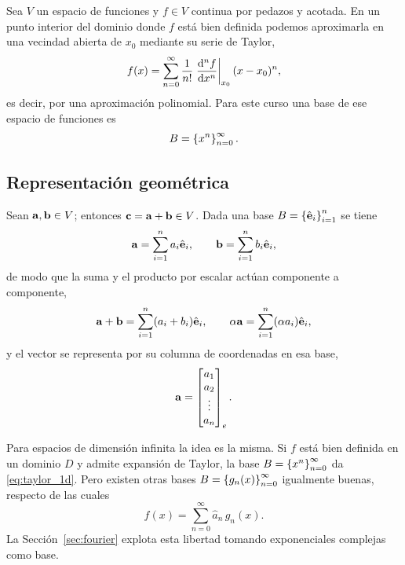 \begin{ejemplo}
  \label{ej:base_infinita}
  Sea $V$ un espacio de funciones y $f\in V$ continua por pedazos y acotada. En
  un punto interior del dominio donde $f$ est\'a bien definida podemos
  aproximarla en una vecindad abierta de $x_0$ mediante su serie de Taylor,
  \begin{equation}
    \label{eq:taylor_1d}
    f(x)=\sum_{n=0}^{\infty}\frac{1}{n!}
      \left. \frac{\mathrm{d}^{n}f}{\mathrm{d}x^{n}} \right|_{x_0}(x-x_0)^n ,
  \end{equation}
  es decir, por una aproximaci\'on polinomial. Para este curso una base de ese
  espacio de funciones es
  \begin{equation}
    \label{eq:base_polinomial}
    B=\left\{ x^n \right\}_{n=0}^{\infty}.
  \end{equation}
\end{ejemplo}

\subsection{Representaci\'on geom\'etrica}
\label{subsec:representacion_geometrica}

Sean $\mathbf{a},\mathbf{b}\in V$; entonces $\mathbf{c}=\mathbf{a}+\mathbf{b}\in V$. Dada una base
$B=\left\{ \hat{\mathbf{e}}_i \right\}_{i=1}^{n}$ se tiene
\begin{equation}
  \label{eq:expansion_base}
  \mathbf{a}=\sum_{i=1}^{n}a_i\hat{\mathbf{e}}_i,
  \qquad
  \mathbf{b}=\sum_{i=1}^{n}b_i\hat{\mathbf{e}}_i,
\end{equation}
de modo que la suma y el producto por escalar act\'uan componente a componente,
\begin{equation}
  \label{eq:suma_componentes}
  \mathbf{a}+\mathbf{b}=\sum_{i=1}^{n}(a_i+b_i)\hat{\mathbf{e}}_i,
  \qquad
  \alpha\mathbf{a}=\sum_{i=1}^{n}(\alpha a_i)\hat{\mathbf{e}}_i ,
\end{equation}
y el vector se representa por su columna de coordenadas en esa base,
\begin{equation}
  \label{eq:columna_coordenadas}
  \mathbf{a}=
  \begin{bmatrix}
    a_1\\a_2\\\vdots\\a_n
  \end{bmatrix}_{e}.
\end{equation}

Para espacios de dimensi\'on infinita la idea es la misma. Si $f$ est\'a bien
definida en un dominio $D$ y admite expansi\'on de Taylor, la base
$B=\left\{ x^n \right\}_{n=0}^{\infty}$ da \eqref{eq:taylor_1d}. Pero existen otras bases
$B=\left\{ g_n(x) \right\}_{n=0}^{\infty}$ igualmente buenas, respecto de las cuales
\begin{equation}
  \label{eq:expansion_general}
  f(x)=\sum_{n=0}^{\infty}\hat{a}_n\,g_n(x).
\end{equation}
La Secci\'on~\ref{sec:fourier} explota esta libertad tomando exponenciales
complejas como base.

